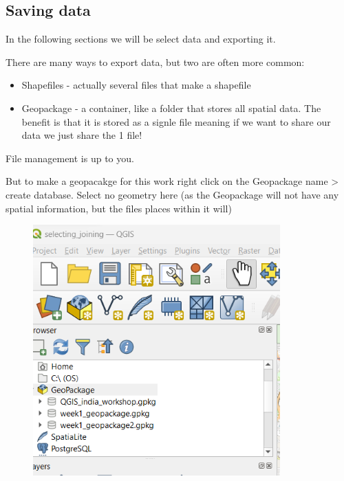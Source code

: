 \documentclass[
  letterpaper,
]{scrbook}
\providecommand{\tightlist}{%
  \setlength{\itemsep}{0pt}\setlength{\parskip}{0pt}}\usepackage{longtable,booktabs,array}
\begin{document}
\hypertarget{saving-data}{%
\subsection{Saving data}\label{saving-data}}

In the following sections we will be select data and exporting it.

There are many ways to export data, but two are often more common:

\begin{itemize}
\tightlist
\item
  Shapefiles - actually several files that make a shapefile
\item
  Geopackage - a container, like a folder that stores all spatial data.
  The benefit is that it is stored as a signle file meaning if we want
  to share our data we just share the 1 file!
\end{itemize}

File management is up to you.

But to make a geopacakge for this work right click on the Geopackage
name \textgreater{} create database. Select no geometry here (as the
Geopackage will not have any spatial information, but the files places
within it will)

\begin{figure}

{\centering \includegraphics[width=3.73958in,height=\textheight]{general_images/geopackage.png}

}

\end{figure}
\end{document}

